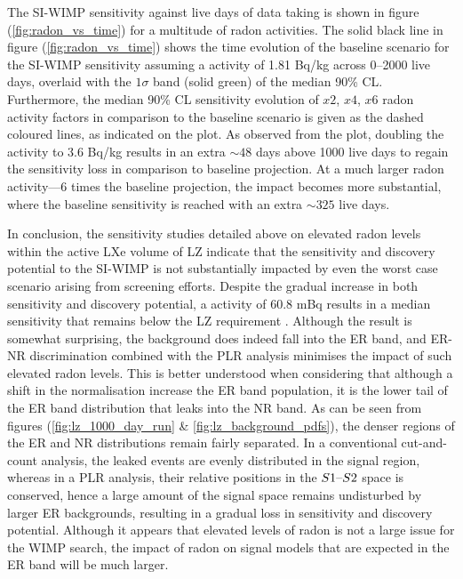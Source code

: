 {The SI-WIMP sensitivity against live days of data taking is shown in figure (\ref{fig:radon_vs_time}) for a multitude of radon activities. The solid black line in figure (\ref{fig:radon_vs_time}) shows the time evolution of the baseline scenario for the SI-WIMP sensitivity assuming a \RnTTT{} activity of 1.81 \micro{}Bq/kg across 0--2000 live days, overlaid with the $1\sigma$ band (solid green) of the median 90\% CL. Furthermore, the median 90\% CL sensitivity evolution of $x2$, $x4$, $x6$ radon activity factors in comparison to the baseline scenario is given as the dashed coloured lines, as indicated on the plot. As observed from the plot, doubling the \RnTTT{} activity to 3.6 \micro{}Bq/kg results in an extra $\sim48$ days above 1000 live days to regain the sensitivity loss in comparison to baseline projection. At a much larger radon activity---6 times the baseline projection, the impact becomes more substantial, where the baseline sensitivity is reached with an extra $\sim325$ live days.

In conclusion, the sensitivity studies detailed above on elevated radon levels within the active LXe volume of LZ indicate that the sensitivity and discovery potential to the SI-WIMP is not substantially impacted by even the worst case scenario arising from screening efforts. Despite the gradual increase in both sensitivity and discovery potential, a \RnTTT{} activity of 60.8 mBq results in a median sensitivity that remains below the LZ requirement \cite{lz_tdr, akerib2018projected}. Although the result is somewhat surprising, the \RnTTT{} background does indeed fall into the ER band, and ER-NR discrimination combined with the PLR analysis minimises the impact of such elevated radon levels. This is better understood when considering that although a shift in the \RnTTT{} normalisation increase the ER band population, it is the lower tail of the ER band distribution that leaks into the NR band. As can be seen from figures (\ref{fig:lz_1000_day_run} \& \ref{fig:lz_background_pdfs}), the denser regions of the ER and NR distributions remain fairly separated. In a conventional cut-and-count analysis, the leaked events are evenly distributed in the signal region, whereas in a PLR analysis, their relative positions in the $S1\text{--}{}S2$ space is conserved, hence a large amount of the signal space remains undisturbed by larger ER backgrounds, resulting in a gradual loss in sensitivity and discovery potential. Although it appears that elevated levels of radon is not a large issue for the WIMP search, the impact of radon on signal models that are expected in the ER band will be much larger.

}
